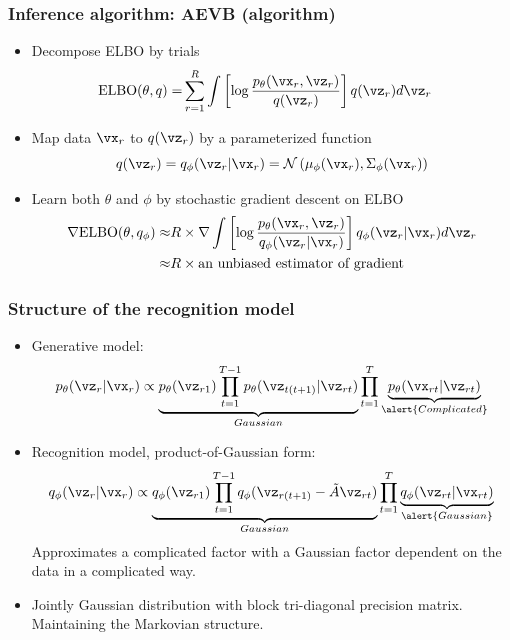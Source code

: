 \documentclass[16pt,presentation]{beamer}
\begin{document}
\begin{frame}
\frametitle{Inference algorithm: AEVB (algorithm)}
\begin{itemize}
\item Decompose ELBO by trials
\[\begin{split}
\text{ELBO}(\theta, q) %
=& \sum_{r=1}^{R} \int \left[\log \frac{p_{\theta}(\vx_r, \vz_r)}{q(\vz_r)}\right] q(\vz_r) d\vz_r 
\end{split}\]
\item Map data $\vx_r$ to $q(\vz_r)$ by a parameterized function
\[q(\vz_r) = q_\phi(\vz_r | \vx_r) = \N\left(\mu_\phi(\vx_r), \Sigma_\phi(\vx_r)\right)\]
\item Learn both $\theta$ and $\phi$ by \alert{stochastic} gradient descent on ELBO
\[\begin{split}
\grad\text{ELBO}(\theta, q_\phi) \approx& R \times \grad \int \left[\log \frac{p_{\theta}(\vx_r, \vz_r)}{q_\phi(\vz_r | \vx_r)}\right] q_\phi(\vz_r| \vx_r) d\vz_r\\
\approx& R \times \text{an unbiased estimator of gradient} %
\end{split}\]
\end{itemize}
\end{frame}

\begin{frame}
\frametitle{Structure of the recognition model}
\begin{itemize}
\item Generative model:
\[p_\theta(\vz_r | \vx_r) \propto \underbrace{p_\theta(\vz_{r1})
\prod_{t=1}^{T-1}p_\theta(\vz_{t(t+1)} | \vz_{rt})}_{Gaussian} 
\prod_{t=1}^T \underbrace{p_\theta(\vx_{rt} | \vz_{rt})}_{\alert{Complicated}}
\]
\item Recognition model, product-of-Gaussian form:
\[q_\phi(\vz_r | \vx_r) \propto \underbrace{q_\phi(\vz_{r1}) 
\prod_{t=1}^{T-1}q_\phi(\vz_{r(t+1)} - \tilde{A}\vz_{rt}) }_{Gaussian}
\prod_{t=1}^T \underbrace{q_\phi(\vz_{rt} | \vx_{rt})}_{\alert{Gaussian}}
\]
Approximates a complicated factor with a Gaussian factor dependent on the data in a complicated way.
\item Jointly Gaussian distribution with block tri-diagonal precision matrix. Maintaining the Markovian structure.
\end{itemize}
\end{frame}
\end{document}
